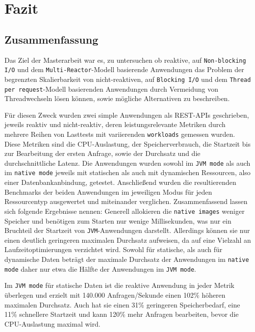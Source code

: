 \section{Fazit}
\label{sec:fazit}
\subsection{Zusammenfassung}
\label{subsec:zusammenfassung}
Das Ziel der Masterarbeit war es, zu untersuchen ob reaktive, auf \verb|Non-blocking I/O| und dem \verb|Multi-Reactor|-Modell basierende
Anwendungen das Problem der begrenzten Skalierbarkeit von nicht-reaktiven, auf \verb|Blocking I/O| und dem \verb|Thread per request|-Modell
basierenden Anwendungen durch Vermeidung von Threadwechseln lösen können, sowie mögliche Alternativen zu beschreiben.

Für diesen Zweck wurden zwei simple Anwendungen als REST-APIs geschrieben, jeweils reaktiv und nicht-reaktiv, deren
leistungsrelevante Metriken durch mehrere Reihen von Lasttests mit variierenden \verb|workloads| gemessen wurden.
Diese Metriken sind die CPU-Auslastung, der Speicherverbrauch, die Startzeit bis zur Bearbeitung der ersten Anfrage,
sowie der Durchsatz und die durchschnittliche Latenz.
Die Anwendungen wurden sowohl im \verb|JVM mode| als auch im \verb|native mode| jeweils mit statischen als auch mit dynamischen
Ressourcen, also einer Datenbankanbindung, getestet.
Anschließend wurden die resultierenden Benchmarks der beiden Anwendungen im jeweiligen Modus für jeden Ressourcentyp ausgewertet und
miteinander verglichen.\newline
Zusammenfassend lassen sich folgende Ergebnisse nennen:\newline
Generell allokieren die \verb|native images| weniger Speicher und benötigen zum Starten nur wenige Millisekunden, was nur ein Bruchteil der Startzeit
von \verb|JVM|-Anwendungen darstellt. Allerdings können sie nur einen deutlich
geringeren maximalen Durchsatz aufweisen, da auf eine Vielzahl an Laufzeitoptimierungen verzichtet wird.
Sowohl für statische, als auch für dynamische Daten beträgt der maximale Durchsatz der Anwendungen im \verb|native mode|
daher nur etwa die Hälfte der Anwendungen im \verb|JVM mode|.

Im \verb|JVM mode| für statische Daten ist die reaktive Anwendung in jeder Metrik überlegen und erzielt mit 140.000 Anfragen/Sekunde
einen 102\% höheren maximalen Durchsatz.
Auch hat sie einen 31\% geringeren Speicherbedarf, eine 11\% schnellere Startzeit und kann 120\% mehr Anfragen bearbeiten,
bevor die CPU-Auslastung maximal wird.

